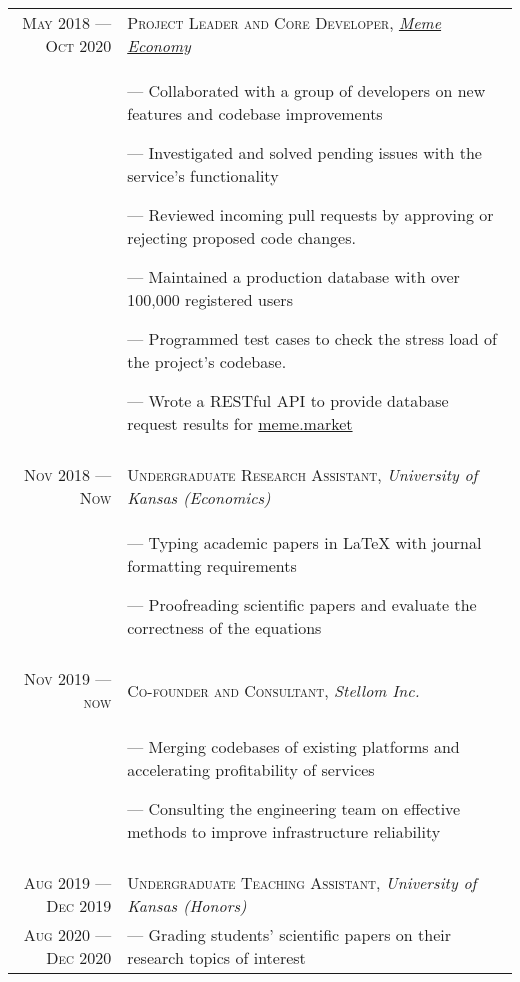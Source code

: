 \documentclass[a4paper, 10pt]{article}
\begin{document}
\begin{tabular}{r|p{12cm}}
	\textsc{May 2018 --- Oct 2020} & \textsc{Project Leader and Core Developer}, \emph{\href{https://meme.market}{Meme Economy}} \\&\footnotesize{
		--- Collaborated with a group of developers on new features and codebase improvements

		--- Investigated and solved pending issues with the service's functionality

		--- Reviewed incoming pull requests by approving or rejecting proposed code changes.

		--- Maintained a production database with over 100,000 registered users

		--- Programmed test cases to check the stress load of the project's codebase.

		--- Wrote a RESTful API to provide database request results for \href{https://meme.market}{meme.market}
	}                                                                                                                            \\\multicolumn{2}{c}{}\\
	
	\textsc{Nov 2018 --- Now}      & \textsc{Undergraduate Research Assistant}, \emph{University of Kansas (Economics)}           \\&\footnotesize{
		--- Typing academic papers in \LaTeX{} with journal formatting requirements

		--- Proofreading scientific papers and evaluate the correctness of the equations
	}                                                                                                                            \\\multicolumn{2}{c}{}\\
	
	\textsc{Nov 2019 --- now}      & \textsc{Co-founder and Consultant}, \emph{Stellom Inc.}                                     \\&\footnotesize{
		--- Merging codebases of existing platforms and accelerating profitability of services

		--- Consulting the engineering team on effective methods to improve infrastructure reliability
	}                                                                                                                            \\\multicolumn{2}{c}{}\\
	
	\textsc{Aug 2019 --- Dec 2019} & \textsc{Undergraduate Teaching Assistant}, \emph{University of Kansas (Honors)}              \\ \textsc{Aug 2020 --- Dec 2020} &\footnotesize{
		--- Grading students' scientific papers on their research topics of interest

}
\end{tabular}
\end{document}
